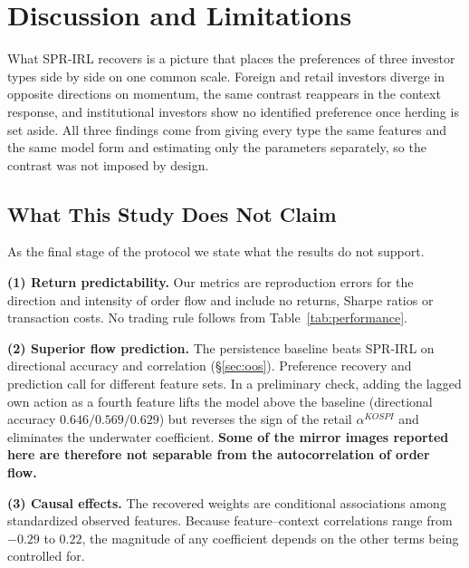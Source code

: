 %

\section{Discussion and Limitations}
\label{sec:discussion}

What SPR-IRL recovers is a picture that places the preferences of three investor
types side by side on one common scale. Foreign and retail investors diverge in
opposite directions on momentum, the same contrast reappears in the context
response, and institutional investors show no identified preference once herding
is set aside. All three findings come from giving every type the same features
and the same model form and estimating only the parameters separately, so the
contrast was not imposed by design.

\subsection{What This Study Does Not Claim}
\label{sec:notclaim}

As the final stage of the protocol we state what the results do not support.

\textbf{(1) Return predictability.} Our metrics are reproduction errors for the
direction and intensity of order flow and include no returns, Sharpe ratios or
transaction costs. No trading rule follows from Table~\ref{tab:performance}.

\textbf{(2) Superior flow prediction.} The persistence baseline beats SPR-IRL on
directional accuracy and correlation (\S\ref{sec:oos}). Preference recovery and
prediction call for different feature sets. In a preliminary check, adding the
lagged own action as a fourth feature lifts the model above the baseline
(directional accuracy $0.646/0.569/0.629$) but reverses the sign of the retail
$\alpha^{KOSPI}$ and eliminates the underwater coefficient. \textbf{Some of the
mirror images reported here are therefore not separable from the autocorrelation
of order flow.}

\textbf{(3) Causal effects.} The recovered weights are conditional associations
among standardized observed features. Because feature--context correlations range
from $-0.29$ to $0.22$, the magnitude of any coefficient depends on the other
terms being controlled for.

